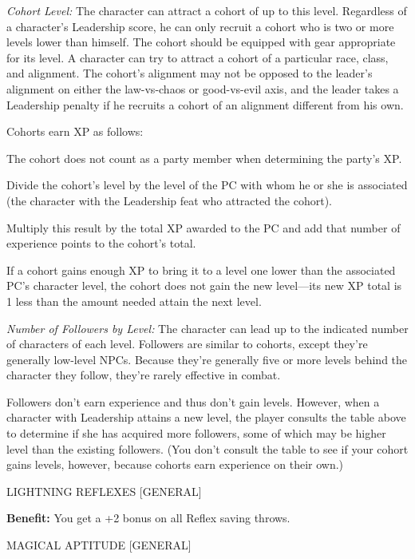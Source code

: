 \documentclass{article}
\begin{document}
\textit{Cohort Level: }The character can attract a cohort of up to this level. 
Regardless of a character's Leadership score, he can only recruit a cohort who 
is two or more levels lower than himself. The cohort should be equipped with gear 
appropriate for its level. A character can try to attract a cohort of a particular 
race, class, and alignment. The cohort's alignment may not be opposed to the leader's 
alignment on either the law-vs-chaos or good-vs-evil axis, and the leader takes 
a Leadership penalty if he recruits a cohort of an alignment different from his 
own.

Cohorts earn XP as follows:

The cohort does not count as a party member when determining the party's XP.

Divide the cohort's level by the level of the PC with whom he or she is associated 
(the character with the Leadership feat who attracted the cohort).

Multiply this result by the total XP awarded to the PC and add that number of experience 
points to the cohort's total.

If a cohort gains enough XP to bring it to a level one lower than the associated 
PC's character level, the cohort does not gain the new level---its new XP total 
is 1 less than the amount needed attain the next level. 

\vspace{12pt}
\textit{Number of Followers by Level: }The character can lead up to the indicated 
number of characters of each level. Followers are similar to cohorts, except they're 
generally low-level NPCs. Because they're generally five or more levels behind 
the character they follow, they're rarely effective in combat.

Followers don't earn experience and thus don't gain levels. However, when a character 
with Leadership attains a new level, the player consults the table above to determine 
if she has acquired more followers, some of which may be higher level than the 
existing followers. (You don't consult the table to see if your cohort gains levels, 
however, because cohorts earn experience on their own.)

\vspace{12pt}
LIGHTNING REFLEXES [GENERAL]

\textbf{Benefit:} You get a +2 bonus on all Reflex saving throws.

\vspace{12pt}
MAGICAL APTITUDE [GENERAL]
\end{document}
